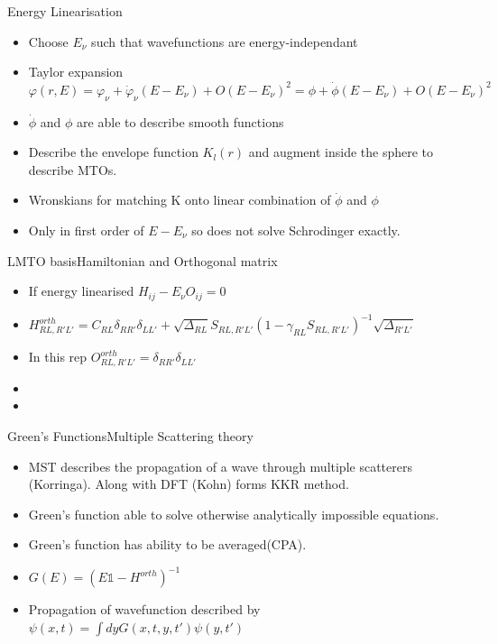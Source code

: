 \documentclass{beamer}
\begin{document}
\begin{frame}{Energy Linearisation}
    \begin{itemize}
        \item{Choose $E_\nu$ such that wavefunctions are energy-independant}
        \item{Taylor expansion $\varphi(r,E) = \varphi_{\nu} + \dot{\varphi}_{\nu}(E-E_\nu)+O(E-E_\nu)^2=\phi + \dot{\phi}(E-E_\nu)+O(E-E_\nu)^2$}
        \item{$\dot{\phi}$ and $\phi$ are able to describe smooth functions }
        \item{Describe the envelope function $K_l(r)$ and augment inside the sphere to describe MTOs.}
        \item{Wronskians for matching K onto linear combination of $\dot{\phi}$ and $\phi$}
        \item{Only in first order of $E-E_\nu$ so does not solve Schrodinger exactly.}
    \end{itemize}
\end{frame}

\begin{frame}{LMTO basis}{Hamiltonian and Orthogonal matrix}
    \begin{itemize}
        \item {If energy linearised $H_{ij}-E_\nu O_{ij}=0$}
        \item{$H^{orth}_{RL,R'L'}=C_{RL}\delta_{RR'}\delta_{LL'} + \sqrt{\Delta_{RL}}S_{RL,R'L'}(1-\gamma_{RL} S_{RL,R'L'})^{-1} \sqrt{\Delta_{R'L'}}$}
        \item{In this rep $O^{orth}_{RL,R'L'}=\delta_{RR'}\delta_{LL'}$}
        \item{}
        \item{}
    \end{itemize}
\end{frame}

\begin{frame}{Green's Functions}{Multiple Scattering theory}
    \begin{itemize}
        \item {MST describes the propagation of a wave through multiple scatterers (Korringa). Along with DFT (Kohn) forms KKR method.}
        \item{Green's function able to solve otherwise analytically impossible equations.}
        \item{Green's function has ability to be averaged(CPA).}
        \item{$G(E)=(E\mathds{1}-H^{orth})^{-1}$}
        \item{Propagation of wavefunction described by $\psi(x,t)=\int dy G(x,t,y,t')\psi(y,t')$}
    \end{itemize}
\end{frame}
\end{document}
